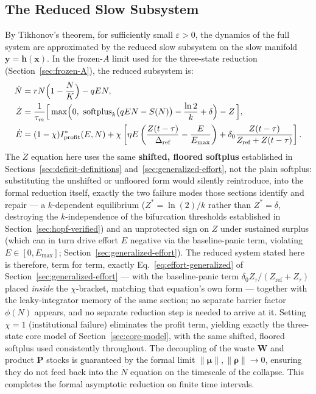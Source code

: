 \documentclass[twocolumn,10pt]{article}
\begin{document}
\subsection{The Reduced Slow Subsystem}
By Tikhonov's theorem, for sufficiently small \(\varepsilon > 0\), the dynamics of the full system are approximated by the reduced slow subsystem on the slow manifold \(\mathbf{y} = \mathbf{h}(\mathbf{x})\). In the frozen-\(A\) limit used for the three-state reduction (Section~\ref{sec:frozen-A}), the reduced subsystem is:
\begin{align}
\dot{N} &= rN\Bigl(1 - \frac{N}{K}\Bigr) - qEN, \\
\dot{Z} &= \frac{1}{\tau_m}\Bigl[\,\max\Bigl(0,\ \text{softplus}_k\bigl(qEN-S(N)\bigr) - \frac{\ln 2}{k} + \delta\Bigr) - Z\,\Bigr], \\
\dot{E} &= (1-\chi) I_{\text{profit}}^*(E, N) + \chi \left[ \eta E \left( \frac{Z(t-\tau)}{\Delta_{\text{ref}}} - \frac{E}{E_{\max}} \right) + \delta_0 \frac{Z(t-\tau)}{Z_{\text{ref}} + Z(t-\tau)} \right].
\end{align}
The $\dot Z$ equation here uses the same \textbf{shifted, floored softplus} established in Sections~\ref{sec:deficit-definitions} and~\ref{sec:generalized-effort}, not the plain softplus: substituting the unshifted or unfloored form would silently reintroduce, into the formal reduction itself, exactly the two failure modes those sections identify and repair --- a $k$-dependent equilibrium ($Z^*=\ln(2)/k$ rather than $Z^*=\delta$, destroying the $k$-independence of the bifurcation thresholds established in Section~\ref{sec:hopf-verified}) and an unprotected sign on $Z$ under sustained surplus (which can in turn drive effort $E$ negative via the baseline-panic term, violating $E\in[0,E_{\max}]$; Section~\ref{sec:generalized-effort}). The reduced system stated here is therefore, term for term, exactly Eq.~\eqref{eq:effort-generalized} of Section~\ref{sec:generalized-effort} --- with the baseline-panic term $\delta_0Z_\tau/(Z_{\text{ref}}+Z_\tau)$ placed \emph{inside} the $\chi$-bracket, matching that equation's own form --- together with the leaky-integrator memory of the same section; no separate barrier factor $\phi(N)$ appears, and no separate reduction step is needed to arrive at it. Setting \(\chi = 1\) (institutional failure) eliminates the profit term, yielding exactly the three-state core model of Section~\ref{sec:core-model}, with the same shifted, floored softplus used consistently throughout. The decoupling of the waste \(\mathbf{W}\) and product \(\mathbf{P}\) stocks is guaranteed by the formal limit \(\|\boldsymbol{\mu}\|, \|\boldsymbol{\rho}\| \to 0\), ensuring they do not feed back into the \(\dot{N}\) equation on the timescale of the collapse. This completes the formal asymptotic reduction on finite time intervals.
\end{document}
